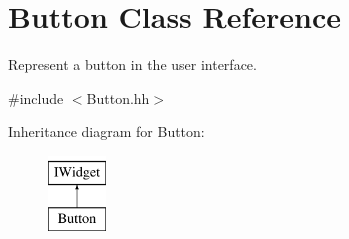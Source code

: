 \hypertarget{classButton}{}\section{Button Class Reference}
\label{classButton}


Represent a button in the user interface.  




{\ttfamily \#include $<$Button.\+hh$>$}

Inheritance diagram for Button\+:\begin{figure}[H]
\begin{center}
\leavevmode
\includegraphics[height=2.000000cm]{classButton}
\end{center}
\end{figure}
